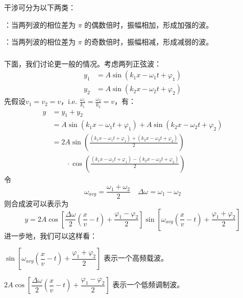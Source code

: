 干涉可分为以下两类：
\begin{Itemize}
    \item {}：当两列波的相位差为 $\pi$ 的偶数倍时，振幅相加，形成加强的波。
    \item {}：当两列波的相位差为 $\pi$ 的奇数倍时，振幅相减，形成减弱的波。
\end{Itemize}
\subsubsection[时域相干]{}
下面，我们讨论更一般的情况。考虑两列正弦波：
\[
    \begin{aligned}
        y_1 & = A \sin(k_1x - \omega_1 t + \varphi_1) \\
        y_2 & = A \sin(k_2x - \omega_2 t + \varphi_2)
    \end{aligned}
\]
先假设\(v_1=v_2=v\)，i.e. \(\frac{\omega_1}{k_1}=\frac{\omega_2}{k_2}=v\)，有：
\[
    \begin{aligned}
        y & = y_1 + y_2                                                                                               \\
          & = A \sin(k_1x - \omega_1 t + \varphi_1) + A \sin(k_2x - \omega_2 t + \varphi_2)                           \\
          & = 2A \sin\left(\frac{(k_1x - \omega_1 t + \varphi_1) + (k_2x - \omega_2 t + \varphi_2)}{2}\right)         \\
          & \qquad \cdot \cos\left(\frac{(k_1x - \omega_1 t + \varphi_1) - (k_2x - \omega_2 t + \varphi_2)}{2}\right)
    \end{aligned}
\]
令
\[
    \omega_{avg}=\frac{\omega_1+\omega_2}{2}\quad\Delta\omega=\omega_1-\omega_2
\]
则合成波可以表示为
\[
    y = 2A \cos\left[\frac{\Delta \omega}{2}\left(\frac{x}{v}-t\right)+\frac{\varphi_1-\varphi_2}{2}\right] \sin\left[\omega_{avg}\left(\frac{x}{v}-t\right)+\frac{\varphi_1+\varphi_2}{2}\right]
\]
进一步地，我们可以这样看：
\begin{Itemize}
    \item \(\sin\left[\omega_{avg}\left(\dfrac{x}{v}-t\right)+\dfrac{\varphi_1+\varphi_2}{2}\right]\) 表示一个高频载波。
    \item \(2A\cos\left[\dfrac{\Delta \omega}{2}\left(\dfrac{x}{v}-t\right)+\dfrac{\varphi_1-\varphi_2}{2}\right]\) 表示一个低频调制波。
\end{Itemize}

